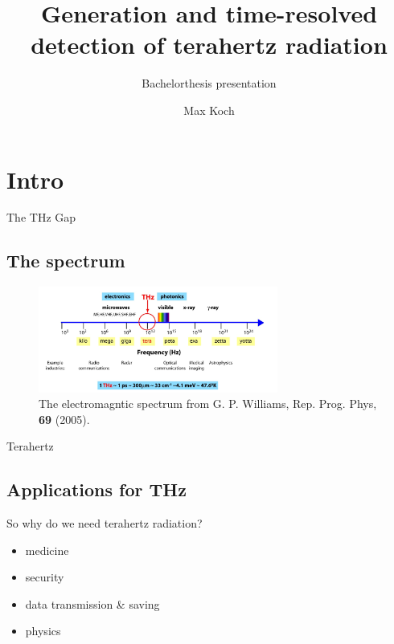 \documentclass[aspectratio=1610, 9pt]{beamer}
\title{Generation and time-resolved detection of
terahertz radiation}
\subtitle{Bachelorthesis presentation}
\author[M.~Koch]{Max Koch}
\institute[AG Wang]{Arbeitsgruppe Wang \\  Fakultät Physik}
\begin{document}
\maketitle

\section{Intro}

\begin{frame}{The THz Gap}
  \subsection{The spectrum}
  \begin{center}
    \begin{figure}
      \includegraphics[width=0.7\textwidth]{images/spectrum.png}
      \caption{\textcolor{tugreen}{The electromagntic spectrum} from G. P. Williams, Rep. Prog. Phys, \textbf{69} (2005)\nocite{spectrum_pic}.}
    \end{figure}
  \end{center}
\end{frame}


\begin{frame}{Terahertz}
  \subsection{Applications for THz}
  \begin{center}
    \begin{minipage}[c]{0.5\linewidth}
      So why do we need terahertz radiation?
      \vspace{0.2in}
      \begin{itemize}
        \item medicine \nocite{THzgap_applications}
        \vspace{0.1in}
        \item security \nocite{thz_explosive_detec}
        \vspace{0.1in}
        \item data transmission \& saving \nocite{communication,datasaving}
        \vspace{0.1in}
        \item physics \nocite{wiki_book}
      \end{itemize}
    \end{minipage}
\end{center}
\end{frame}
\end{document}
